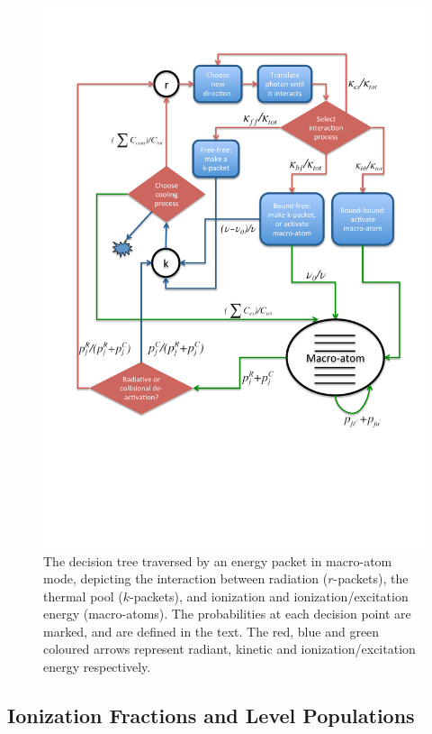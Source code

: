 \begin{figure}
\centering
\includegraphics[width=1.0\textwidth, clip=true, trim=0 2.6in 0in 0in ]{figures/03-radtrans/flow_colour.pdf}
\caption
{
The decision tree traversed by an energy packet 
in macro-atom mode, depicting the interaction
between radiation ($r$-packets), the thermal pool ($k$-packets), and ionization
and ionization/excitation energy (macro-atoms). 
The probabilities at each decision point are 
marked, and are defined in the text. The red, blue and green coloured arrows
represent radiant, kinetic and ionization/excitation energy respectively.
} 
\label{fig:flow_matom}
\end{figure}





\subsection{Ionization Fractions and Level Populations}

